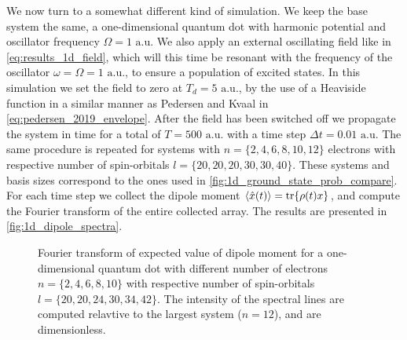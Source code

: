 We now turn to a somewhat different kind of simulation. We keep the 
base system the same, a one-dimensional quantum dot with harmonic potential and oscillator 
frequency $\Omega=1 \text{ a.u.}$ We also apply an external oscillating field like in
\autoref{eq:results_1d_field}, which will this time be resonant with the frequency of the 
oscillator $\omega=\Omega=1 \text{ a.u.}$, to ensure a population of excited states. In this simulation 
we set the field to zero at $T_d = 5 \text{ a.u.}$, by the use of a Heaviside function in a 
similar manner as Pedersen and Kvaal \cite{pedersen2019symplectic}
in \autoref{eq:pedersen_2019_envelope}. After the field has been switched off we propagate 
the system in time for a total of $T = 500 \text{ a.u.}$ with a time step
$\Delta t=0.01 \text{ a.u.}$
The same procedure is repeated for systems with $n=\{2,4,6,8,10,12\}$ electrons with 
respective number of spin-orbitals $l=\{20,20,20,30,30,40\}$. These systems and basis 
sizes correspond to the ones used in \autoref{fig:1d_ground_state_prob_compare}.
For each time step we collect the dipole moment $\ev{\hat{x}(t)} = \tr{\rho(t) x}$,
and compute the 
Fourier transform of the entire collected array. The results are presented in 
\autoref{fig:1d_dipole_spectra}.

\begin{figure}
    \centering
    \caption{Fourier transform of expected value of dipole moment for 
        a one-dimensional quantum dot with different number of electrons
        $n=\{2,4,6,8,10\}$ with respective number of spin-orbitals 
        $l=\{20,20,24,30,34,42\}$. The intensity of the spectral lines 
        are computed relavtive to the largest system ($n=12$), and are 
        dimensionless.
    }
    \label{fig:1d_dipole_spectra}
\end{figure}

